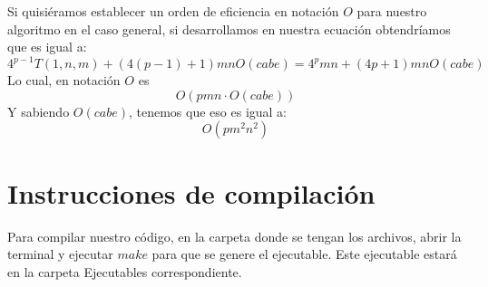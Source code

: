 \documentclass[a4paper, 11pt]{article}
\begin{document}
Si quisiéramos establecer un orden de eficiencia en notación $O$ para nuestro algoritmo en el caso general, si desarrollamos en nuestra ecuación obtendríamos que es igual a:
\[
4^{p-1}T(1,n,m)+ (4(p-1)+1)mnO(cabe) = 4^{p}mn + (4p+1)mnO(cabe)
\]
Lo cual, en notación $O$ es
\[
O(pmn \cdot O(cabe))
\]
Y sabiendo $O(cabe)$, tenemos que eso es igual a:
\[
O(pm^2n^2)
\]

\section{Instrucciones de compilación}

Para compilar nuestro código, en la carpeta donde se tengan los archivos, abrir la terminal y ejecutar $make$ para que se genere el ejecutable. Este ejecutable estará en la carpeta Ejecutables correspondiente.
\end{document}
